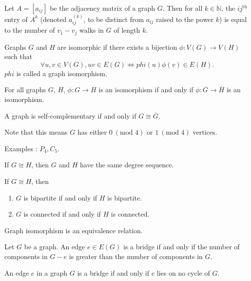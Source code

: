 \documentclass{article}
\newcommand{\N}{\mathbb N}
\begin{document}
\medskip{}

    Let $A = [a_{ij}]$ be the adjacency matrix of a graph $G$. Then for all $k \in \N$, the $ij^{\text{th}}$ entry of $A^k$ (denoted $a_{ij}^{(k)}$, to be distinct from $a_{ij}$ raised to the power $k$) is equal to the number of $v_1 - v_j$ walks in $G$ of length $k$.

\medskip{}

    Graphs $G$ and $H$ are isomorphic if there exists a bijection $\phi: V(G) \to V(H)$ such that $$\forall u,v \in V(G), uv \in E(G) \iff phi(u)\phi(v) \in E(H).$$
    $phi$ is called a graph isomorphism.

\medskip{}

    For all graphs $G$, $H$, $\phi: G \to H$ is an isomorphism if and only if $\phi: \overline G \to \overline H$ is an isomorphism.

\medskip{}

    A graph is self-complementary if and only if $G \cong \overline G$.

    Note that this means $G$ has either $0~(\text{mod } 4)$ or $1~(\text{mod } 4)$ vertices.

    Examples : $P_4, C_5$.

\medskip{}

    If $G \cong H$, then $G$ and $H$ have the same degree sequence.

\medskip{}

    If $G \cong H$, then
    \begin{enumerate}
        \item $G$ is bipartite if and only if $H$ is bipartite.
        \item $G$ is connected if and only if $H$ is connected.
    \end{enumerate}

\medskip{}

    Graph isomorphism is an equivalence relation.

\medskip{}

    Let $G$ be a graph. An edge $e \in E(G)$ is a bridge if and only if the number of components in $G - e$ is greater than the number of components in $G$.

\medskip{}

    An edge $e$ in a graph $G$ is a bridge if and only if $e$ lies on no cycle of $G$.
\end{document}
